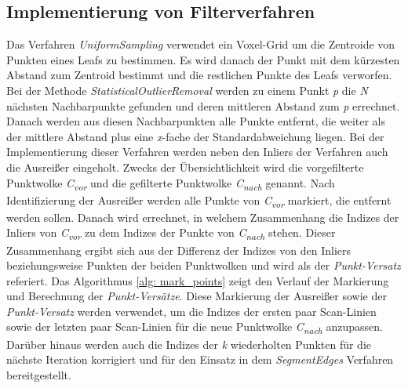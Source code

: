 \subsection{Implementierung von Filterverfahren}
Das Verfahren \textit{UniformSampling} verwendet ein Voxel-Grid um die Zentroide von Punkten eines Leafs zu bestimmen. Es wird danach der Punkt mit dem kürzesten Abstand zum Zentroid bestimmt und die restlichen Punkte des Leafs verworfen. Bei der Methode \textit{StatisticalOutlierRemoval} werden zu einem Punkt \textit{p} die \textit{N} nächsten Nachbarpunkte gefunden und deren mittleren Abstand zum \textit{p} errechnet. Danach werden aus diesen Nachbarpunkten alle Punkte entfernt, die weiter als der mittlere Abstand plus eine \textit{x}-fache der Standardabweichung liegen. Bei der Implementierung dieser Verfahren werden neben den Inliers der Verfahren auch die Ausreißer eingeholt. Zwecks der Übersichtlichkeit wird die vorgefilterte Punktwolke \textit{C\textsubscript{vor}} und die gefilterte Punktwolke \textit{C\textsubscript{nach}} genannt. Nach Identifizierung der Ausreißer werden alle Punkte von \textit{C\textsubscript{vor}} markiert, die entfernt werden sollen. Danach wird errechnet, in welchem Zusammenhang die Indizes der Inliers von \textit{C\textsubscript{vor}} zu dem Indizes der Punkte von \textit{C\textsubscript{nach}} stehen. Dieser Zusammenhang ergibt sich aus der Differenz der Indizes von den Inliers beziehungsweise Punkten der beiden Punktwolken und wird als der \textit{Punkt-Versatz} referiert. Das Algorithmus \ref{alg: mark_points} zeigt den Verlauf der Markierung und Berechnung der \textit{Punkt-Versätze}. Diese Markierung der Ausreißer sowie der \textit{Punkt-Versatz} werden verwendet, um die Indizes der ersten paar Scan-Linien sowie der letzten paar Scan-Linien für die neue Punktwolke \textit{C\textsubscript{nach}} anzupassen. Darüber hinaus werden auch die Indizes der \textit{k} wiederholten Punkten für die nächste Iteration korrigiert und für den Einsatz in dem \textit{SegmentEdges} Verfahren bereitgestellt. 

